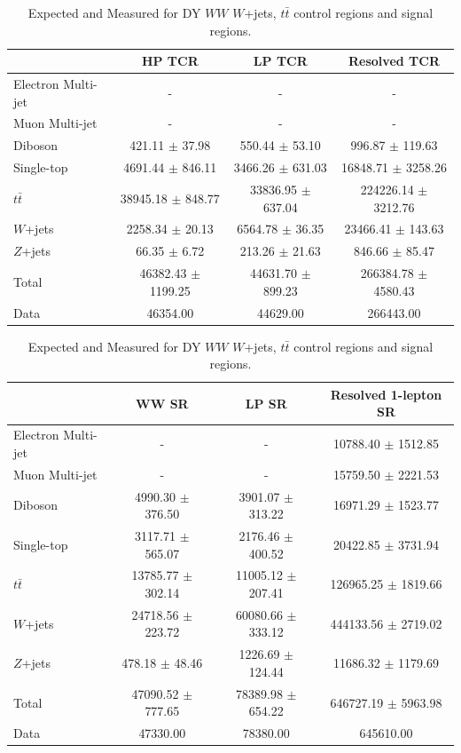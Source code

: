 \begin{table}
\begin{tabular}{|l|c|c|c|}
\hline
	  &	 HP  TCR &	 LP  TCR &	Resolved TCR \\\hline 
	Electron Multi-jet &	- &	- &	- \\\hline 
	Muon Multi-jet &	- &	- &	- \\\hline 
	Diboson &	421.11 $\pm$ 37.98 &	550.44 $\pm$ 53.10 &	996.87 $\pm$ 119.63 \\\hline 
	Single-top &	4691.44 $\pm$ 846.11 &	3466.26 $\pm$ 631.03 &	16848.71 $\pm$ 3258.26 \\\hline 
	$t\bar{t}$ &	38945.18 $\pm$ 848.77 &	33836.95 $\pm$ 637.04 &	224226.14 $\pm$ 3212.76 \\\hline 
	$W$+jets &	2258.34 $\pm$ 20.13 &	6564.78 $\pm$ 36.35 &	23466.41 $\pm$ 143.63 \\\hline 
	$Z$+jets &	66.35 $\pm$ 6.72 &	213.26 $\pm$ 21.63 &	846.66 $\pm$ 85.47 \\\hline 
	Total &	46382.43 $\pm$ 1199.25 &	44631.70 $\pm$ 899.23 &	266384.78 $\pm$ 4580.43 \\\hline 
	Data &	46354.00 &	44629.00 &	266443.00 \\\hline 
\end{tabular}

\begin{tabular}{|l|c|c|c|}
\hline
	  &	 WW SR &	 LP SR &	Resolved 1-lepton SR \\\hline 
	Electron Multi-jet &	- &	- &	10788.40 $\pm$ 1512.85 \\\hline 
	Muon Multi-jet &	- &	- &	15759.50 $\pm$ 2221.53 \\\hline 
	Diboson &	4990.30 $\pm$ 376.50 &	3901.07 $\pm$ 313.22 &	16971.29 $\pm$ 1523.77 \\\hline 
	Single-top &	3117.71 $\pm$ 565.07 &	2176.46 $\pm$ 400.52 &	20422.85 $\pm$ 3731.94 \\\hline 
	$t\bar{t}$ &	13785.77 $\pm$ 302.14 &	11005.12 $\pm$ 207.41 &	126965.25 $\pm$ 1819.66 \\\hline 
	$W$+jets &	24718.56 $\pm$ 223.72 &	60080.66 $\pm$ 333.12 &	444133.56 $\pm$ 2719.02 \\\hline 
	$Z$+jets &	478.18 $\pm$ 48.46 &	1226.69 $\pm$ 124.44 &	11686.32 $\pm$ 1179.69 \\\hline 
	Total &	47090.52 $\pm$ 777.65 &	78389.98 $\pm$ 654.22 &	646727.19 $\pm$ 5963.98 \\\hline 
	Data &	47330.00 &	78380.00 &	645610.00 \\\hline 
\end{tabular}
\caption{Expected and Measured for DY $WW$ $W$+jets, $t\bar{t}$ control regions and signal regions.}
\label{tbl:hvtww_yields_tcr}
\end{table}

